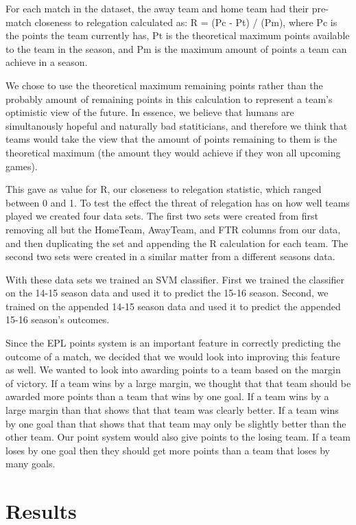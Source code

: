 \documentclass[conference]{IEEEtran}
\begin{document}
For each match in the dataset, the away team and home team had their pre-match closeness to relegation calculated as: R = (Pc - Pt) / (Pm), where Pc is the points the team currently has, Pt is the theoretical maximum points available to the team in the season, and Pm is the maximum amount of points a team can achieve in a season. 

We chose to use the theoretical maximum remaining points rather than the probably amount of remaining points in this calculation to represent a team's optimistic view of the future. In essence, we believe that humans are simultanously hopeful and naturally bad statiticians, and therefore we think that teams would take the view that the amount of points remaining to them is the theoretical maximum (the amount they would achieve if they won all upcoming games). 

This gave as value for R, our closeness to relegation statistic, which ranged between 0 and 1. To test the effect the threat of relegation has on how well teams played we created four data sets. The first two sets were created from first removing all but the HomeTeam, AwayTeam, and FTR columns from our data, and then duplicating the set and appending the R calculation for each team. The second two sets were created in a similar matter from a different seasons data.

With these data sets we trained an SVM classifier. First we trained the classifier on the 14-15 season data and used it to predict the 15-16 season. Second, we trained on the appended 14-15 season data and used it to predict the appended 15-16 season's outcomes.

Since the EPL points system is an important feature in correctly predicting the outcome of a match, we decided that we would look into improving this feature as well. We wanted to look into awarding points to a team based on the margin of victory. If a team wins by a large margin, we thought that that team should be awarded more points than a team that wins by one goal. If a team wins by a large margin than that shows that that team was clearly better. If a team wins by one goal than that shows that that team may only be slightly better than the other team. Our point system would also give points to the losing team. If a team loses by one goal then they should get more points than a team that loses by many goals.

\section{Results}
\end{document}
